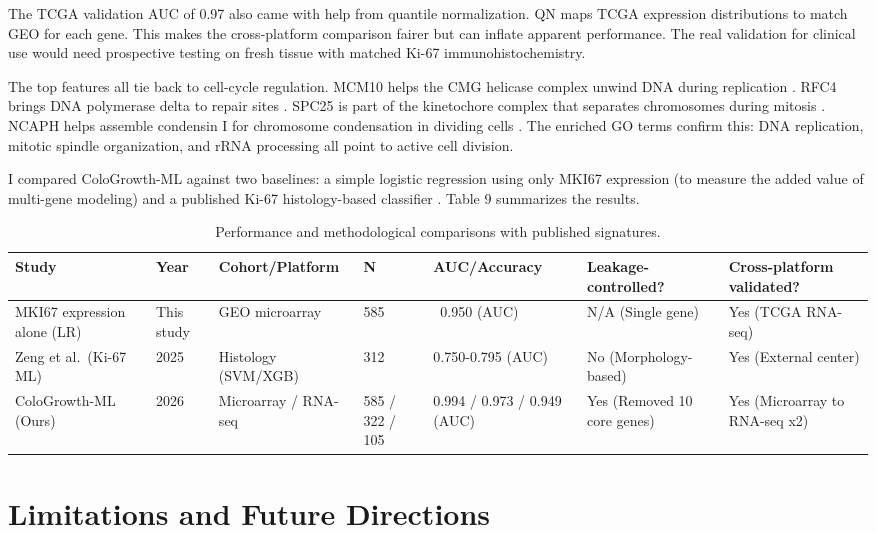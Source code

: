 \documentclass[12pt]{article}
\begin{document}
The TCGA validation AUC of 0.97 also came with help from quantile normalization. QN maps TCGA expression distributions to match GEO for each gene. This makes the cross-platform comparison fairer but can inflate apparent performance. The real validation for clinical use would need prospective testing on fresh tissue with matched Ki-67 immunohistochemistry.

The top features all tie back to cell-cycle regulation. MCM10 helps the CMG helicase complex unwind DNA during replication \citep{langston2017}. RFC4 brings DNA polymerase delta to repair sites \citep{overmeer2010}. SPC25 is part of the kinetochore complex that separates chromosomes during mitosis \citep{bharadwaj2004}. NCAPH helps assemble condensin I for chromosome condensation in dividing cells \citep{seipold2009}. The enriched GO terms confirm this: DNA replication, mitotic spindle organization, and rRNA processing all point to active cell division.

I compared ColoGrowth-ML against two baselines: a simple logistic regression using only MKI67 expression (to measure the added value of multi-gene modeling) and a published Ki-67 histology-based classifier \citep{zeng2025}. Table 9 summarizes the results.

\begin{table}[H]
\centering
\caption{Performance and methodological comparisons with published signatures.}
\begin{tabular}{lllllll}
\toprule
Study & Year & Cohort/Platform & N & AUC/Accuracy & Leakage-controlled? & Cross-platform validated? \\
\midrule
MKI67 expression alone (LR) & This study & GEO microarray & 585 & ~0.950 (AUC) & N/A (Single gene) & Yes (TCGA RNA-seq) \\
Zeng et al.\ (Ki-67 ML) & 2025 & Histology (SVM/XGB) & 312 & 0.750-0.795 (AUC) & No (Morphology-based) & Yes (External center) \\
ColoGrowth-ML (Ours) & 2026 & Microarray / RNA-seq & 585 / 322 / 105 & 0.994 / 0.973 / 0.949 (AUC) & Yes (Removed 10 core genes) & Yes (Microarray to RNA-seq x2) \\
\bottomrule
\end{tabular}
\end{table}

\section{Limitations and Future Directions}
\end{document}
